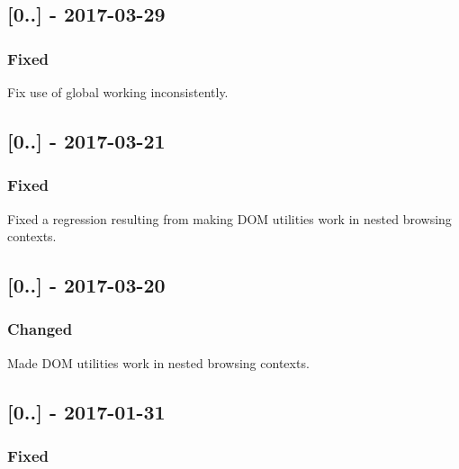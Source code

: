 \subsection*{\mbox{[}0..\mbox{]} -\/ 2017-\/03-\/29}

\subsubsection*{Fixed}


\begin{DoxyItemize}
\item Fix use of {\ttfamily global} working inconsistently.
\end{DoxyItemize}

\subsection*{\mbox{[}0..\mbox{]} -\/ 2017-\/03-\/21}

\subsubsection*{Fixed}


\begin{DoxyItemize}
\item Fixed a regression resulting from making D\+OM utilities work in nested browsing contexts.
\end{DoxyItemize}

\subsection*{\mbox{[}0..\mbox{]} -\/ 2017-\/03-\/20}

\subsubsection*{Changed}


\begin{DoxyItemize}
\item Made D\+OM utilities work in nested browsing contexts.
\end{DoxyItemize}

\subsection*{\mbox{[}0..\mbox{]} -\/ 2017-\/01-\/31}

\subsubsection*{Fixed}


